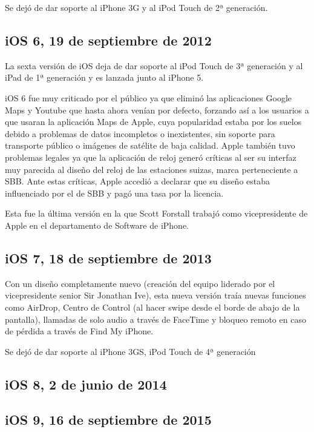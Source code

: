 Se dejó de dar soporte al iPhone 3G y al iPod Touch de 2ª generación.

\subsection{iOS 6, 19 de septiembre de 2012}
La sexta versión de iOS deja de dar soporte al iPod Touch de 3ª generación y al iPad de 1ª generación y es lanzada junto al iPhone 5.

iOS 6 fue muy criticado por el público ya que eliminó las aplicaciones Google Maps y Youtube que hasta ahora venían por defecto, forzando así a los usuarios a que usaran la aplicación Maps de Apple, cuya popularidad estaba por los suelos debido a problemas de datos incompletos o inexistentes, sin soporte para transporte público o imágenes de satélite de baja calidad. Apple también tuvo problemas legales ya que la aplicación de reloj generó críticas al ser su interfaz muy parecida al diseño del reloj de las estaciones suizas, marca perteneciente a SBB. Ante estas críticas, Apple accedió a declarar que su diseño estaba influenciado por el de SBB y pagó una tasa por la licencia. 

Esta fue la última versión en la que Scott Forstall trabajó como vicepresidente de Apple en el departamento de Software de iPhone.

\subsection{iOS 7, 18 de septiembre de 2013}
Con un diseño completamente nuevo (creación del equipo liderado por el vicepresidente senior Sir Jonathan Ive), esta nueva versión traía nuevas funciones como AirDrop, Centro de Control (al hacer swipe desde el borde de abajo de la pantalla), llamadas de solo audio a través de FaceTime y bloqueo remoto en caso de pérdida a través de Find My iPhone.

Se dejó de dar soporte al iPhone 3GS, iPod Touch de 4ª generación 

\subsection{iOS 8, 2 de junio de 2014}

\subsection{iOS 9, 16 de septiembre de 2015}

\chapterend